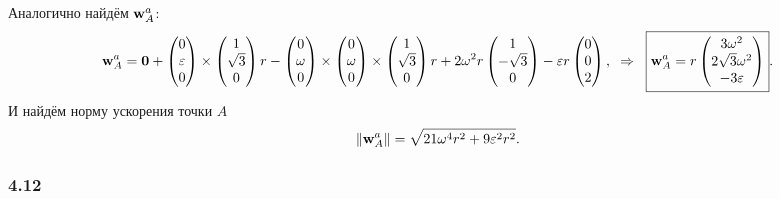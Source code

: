 Аналогично найдём $\mbox{\boldmath $\mathrm{w}$}^a_A$:
$$
    \mbox{\boldmath $\mathrm{w}$}^a_A = \mbox{\boldmath $0$}  + \begin{pmatrix}
        0 \\ \varepsilon \\ 0 
    \end{pmatrix} \times \begin{pmatrix}
        1 \\ \sqrt{3} \\ 0
    \end{pmatrix} r - \begin{pmatrix}
        0 \\ \omega \\ 0
    \end{pmatrix} \times
    \begin{pmatrix}
        0 \\ \omega \\ 0
    \end{pmatrix} \times
    \begin{pmatrix}
        1 \\ \sqrt{3} \\ 0
    \end{pmatrix} r +
    2 \omega^2 r \begin{pmatrix}
        1 \\ -\sqrt{3} \\ 0
    \end{pmatrix} - \varepsilon r \begin{pmatrix}
        0 \\ 0 \\ 2
    \end{pmatrix},
    \hspace{0.2cm} \Rightarrow \hspace{0.2cm} 
    \boxed{\mbox{\boldmath $\mathrm{w}$}^a_A = r \begin{pmatrix}
        3 \omega^2 \\ 2 \sqrt{3} \omega^2 \\ - 3 \varepsilon 
    \end{pmatrix}}.
$$
И найдём норму ускорения точки $A$
$$
    \|\mbox{\boldmath $\mathrm{w}$}_A^a\| = \sqrt{21 \omega^4 r^2 + 9 \varepsilon^2 r^2}.
$$


\subsubsection*{4.12}

